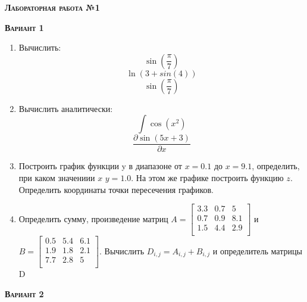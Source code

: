 \textsc{\textbf{Лабораторная работа №1 }}

\textsc{\textbf{Вариант 1}}

\begin{enumerate}
\item Вычислить: 
\begin{equation*}\sin \left( \dfrac{\pi}{7} \right)\end{equation*}
\begin{equation*}\ln(3+sin(4))                     \end{equation*}
\begin{equation*}\sin \left( \dfrac{\pi}{7} \right)\end{equation*}

\item Вычислить аналитически: 
 \begin{equation*} \int \cos(x^2)          \end{equation*}\begin{equation*} {\dfrac{\partial \sin(5 x +3)}{\partial x}} \end{equation*}
\item Построить график функции y в диапазоне от $x=0.1$ до $x=9.1$, определить, при каком значениии $x$ $y=1.0$. На этом же графике построить функцию $z $. Определить координаты точки пересечения графиков. \item Определить сумму, произведение матриц $A=\begin{bmatrix}
3.3 &0.7 &5 \\
0.7 &0.9 &8.1 \\
1.5 &4.4 &2.9 \\
\end{bmatrix}
$ и $B=\begin{bmatrix}
0.5 &5.4 &6.1 \\
1.9 &1.8 &2.1 \\
7.7 &2.8 &5 \\
\end{bmatrix}
$. Вычислить $D_{i,j}=A_{i,j} + B_{i,j}$ и определитель матрицы D
\end{enumerate}
\textsc{\textbf{Вариант 2}}

